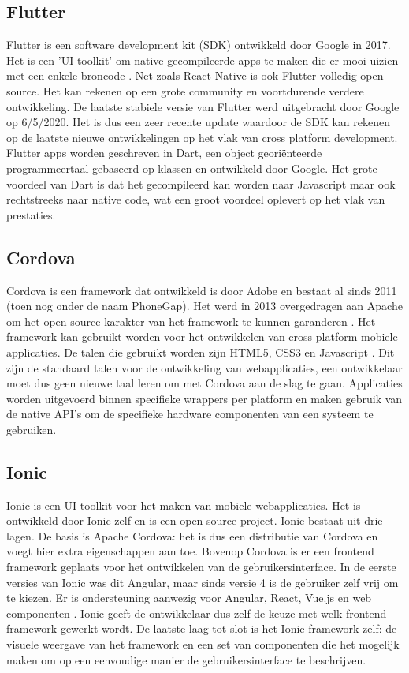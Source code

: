 \subsection{Flutter}

Flutter is een software development kit (SDK) ontwikkeld door Google in 2017. Het is een 'UI toolkit' om native gecompileerde apps te maken die er mooi uizien met een enkele broncode \autocite{Google2020}. Net zoals React Native is ook Flutter volledig open source. Het kan rekenen op een grote community en voortdurende verdere ontwikkeling. De laatste stabiele versie van Flutter werd uitgebracht door Google op 6/5/2020. Het is dus een zeer recente update waardoor de SDK kan rekenen op de laatste nieuwe ontwikkelingen op het vlak van cross platform development. Flutter apps worden geschreven in Dart, een object georiënteerde programmeertaal gebaseerd op klassen en ontwikkeld door Google. Het grote voordeel van Dart is dat het gecompileerd kan worden naar Javascript maar ook rechtstreeks naar native code, wat een groot voordeel oplevert op het vlak van prestaties.

\subsection{Cordova}

Cordova is een framework dat ontwikkeld is door Adobe en bestaat al sinds 2011 (toen nog onder de naam PhoneGap). Het werd in 2013 overgedragen aan Apache om het open source karakter van het framework te kunnen garanderen . Het framework kan gebruikt worden voor het ontwikkelen van cross-platform mobiele applicaties. De talen die gebruikt worden zijn HTML5, CSS3 en Javascript \autocite{Apache2020}. Dit zijn de standaard talen voor de ontwikkeling van webapplicaties, een ontwikkelaar moet dus geen nieuwe taal leren om met Cordova aan de slag te gaan. Applicaties worden uitgevoerd binnen specifieke wrappers per platform en maken gebruik van de native API's om de specifieke hardware componenten van een systeem te gebruiken.

\subsection{Ionic}

Ionic is een UI toolkit voor het maken van mobiele webapplicaties. Het is ontwikkeld door Ionic zelf en is een open source project. Ionic bestaat uit drie lagen. De basis is Apache Cordova: het is dus een distributie van Cordova en voegt hier extra eigenschappen aan toe. Bovenop Cordova is er een frontend framework geplaats voor het ontwikkelen van de gebruikersinterface. In de eerste versies van Ionic was dit Angular, maar sinds versie 4 is de gebruiker zelf vrij om te kiezen. Er is ondersteuning aanwezig voor Angular, React, Vue.js en web componenten \autocite{Schiemann2019}. Ionic geeft de ontwikkelaar dus zelf de keuze met welk frontend framework gewerkt wordt. De laatste laag tot slot is het Ionic framework zelf: de visuele weergave van het framework en een set van componenten die het mogelijk maken om op een eenvoudige manier de gebruikersinterface te beschrijven.

